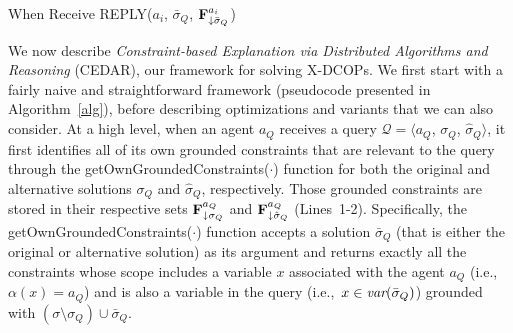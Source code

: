 \documentclass[twoside,11pt]{article}
\begin{document}
\begin{procedure}[!t]%
\DontPrintSemicolon
{}



\caption{When Receive REPLY($a_i$, $\bar{\sigma}_Q$, ${\bf{F}}^{a_i}_{\downarrow \bar{\sigma}_Q}$)}
\end{procedure}





We now describe \emph{Constraint-based Explanation via Distributed Algorithms and Reasoning} (CEDAR), our framework for solving X-DCOPs. We first start with a fairly naive and straightforward framework (pseudocode presented in Algorithm~\ref{alg}), before describing optimizations and variants that we can also consider. At a high level, when an agent $a_Q$ receives a query $\mathcal{Q} = \langle a_Q$, $\sigma_Q$, $\hat{\sigma}_Q \rangle$, it first identifies all of its own grounded constraints that are relevant to the query through the getOwnGroundedConstraints($\cdot$) function for both the original and alternative solutions $\sigma_Q$ and $\hat{\sigma}_Q$, respectively. Those grounded constraints are stored in their respective sets ${\bf{F}}^{a_Q}_{\downarrow \sigma_Q}$ and ${\bf{F}}^{a_Q}_{\downarrow \hat{\sigma}_Q}$ (Lines~1-2). Specifically, the getOwnGroundedConstraints($\cdot$) function accepts a solution $\bar{\sigma}_Q$ (that is either the original or alternative solution) as its argument and returns exactly all the constraints whose scope includes a variable $x$ associated with the agent $a_Q$ (i.e.,~$\alpha(x) = a_Q$) and is also a variable in the query (i.e.,~$x \in {\textit{var}(\bar{\sigma}_Q)}$) grounded with $(\sigma \setminus \sigma_{Q}) \cup \bar{\sigma}_Q$. 
\end{document}
